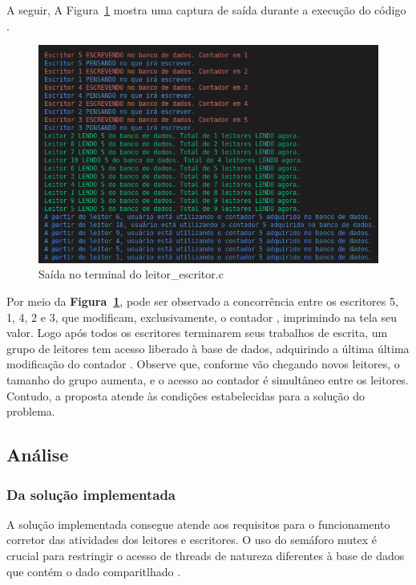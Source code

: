 \documentclass[
	12pt,				%
	openright,			%
	oneside,			%
	a4paper,			%
	chapter=TITLE,		%
	english,			%
	french,				%
	spanish,			%
	brazil				%
	]{abntex2}
\theoremstyle{definition}
\begin{document}
A seguir, A Figura~\ref{fig:1} mostra uma captura de saída durante a execução do código .

\begin{figure}[h]
    \centering
    \includegraphics[width=1.0\textwidth]{imagens/out_leitor_escritor.png}
	\caption{Saída no terminal do leitor\_escritor.c}
	\label{fig:1}
\end{figure}

Por meio da \textbf{Figura~\ref{fig:1}}, pode ser observado a concorrência entre os escritores 5, 1, 4, 2 e 3, que modificam, exclusivamente, o contador , imprimindo na tela seu valor. Logo após todos os escritores terminarem seus trabalhos de escrita, um grupo de leitores tem acesso liberado à base de dados, adquirindo a última última modificação do contador . Observe que, conforme vão chegando novos leitores, o tamanho do grupo aumenta, e o acesso ao contador  é simultâneo entre os leitores. Contudo, a proposta atende às condições estabelecidas para a solução do problema.

\subsection{Análise}
\subsubsection{Da solução implementada}

A solução implementada consegue atende aos requisitos para o funcionamento corretor das atividades dos leitores e escritores. O uso do semáforo mutex  é crucial para restringir o acesso de threads de natureza diferentes à base de dados que contém o dado comparitlhado . 
\end{document}
